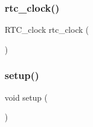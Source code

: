 \subsubsection{\texorpdfstring{rtc\+\_\+clock()}{rtc\_clock()}}
{\footnotesize\ttfamily R\+T\+C\+\_\+clock rtc\+\_\+clock (\begin{DoxyParamCaption}\item[{X\+T\+AL}]{ }\end{DoxyParamCaption})}

\mbox{\label{_time_arduino_due_8ino_a4fc01d736fe50cf5b977f755b675f11d}} 
\subsubsection{\texorpdfstring{setup()}{setup()}}
{\footnotesize\ttfamily void setup (\begin{DoxyParamCaption}{ }\end{DoxyParamCaption})}

